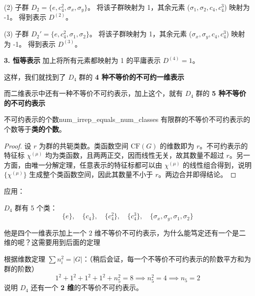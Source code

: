 (2) 子群 $D_2 = \{e, c_4^2, \sigma_x, \sigma_y\}$。
将该子群映射为 1，其余元素 ($\sigma_1, \sigma_2, c_4, c_4^3$) 映射为 -1。
得到表示 $D^{(2)}$。

(3) 子群 $D_2' = \{e, c_4^2, \sigma_1, \sigma_2\}$。
将该子群映射为 1，其余元素 ($\sigma_x, \sigma_y, c_4, c_4^3$) 映射为 -1。
得到表示 $D^{(3)}$。

\textbf{3. 恒等表示}
加上将所有元素都映射为 1 的平庸表示 $D^{(4)} = 1$。

这样，我们就找到了 $D_4$ 群的 \textbf{4 种不等价的不可约一维表示}

而二维表示中还有一种不等价不可约表示，加上这个，就有 $D_4$ 群的 \textbf{5 种不等价的不可约表示}

\begin{theorem}{不可约表示的个数}{num_irrep_equals_num_classes}
    有限群的不等价不可约表示的个数等于\textbf{类的个数}。
\end{theorem}
\begin{proof}
    设 $r$ 为群的共轭类数。类函数空间 $\mathrm{CF}(G)$ 的维数即为 $r$。不可约表示的特征标 $\chi^{(\mu)}$ 均为类函数，且两两正交，因而线性无关，故其数量不超过 $r$。另一方面，由唯一分解定理，任意表示的特征标都可以由 $\chi^{(\mu)}$ 的线性组合得到，说明 $\{\chi^{(\mu)}\}$ 生成整个类函数空间，因此其数量不小于 $r$。两边合并即得结论。
\end{proof}
应用：

$D_4$ 群有 5 个类：
    \begin{equation}
        \{e\}, \quad \{c_4\}, \quad \{c_4^{2}\},\quad \{c_4^3\} , \quad \{\sigma_x, \sigma_y ,\sigma_1, \sigma_2\}
    \end{equation}

    他是四个一维表示加上一个 $2$ 维不等价不可约表示，为什么能笃定还有一个是二维的呢？这需要用到后面的定理

    根据维数定理 $\sum n_i^2 = |G|$：（稍后会证，每一个不等价不可约表示的阶数平方和为群的阶数）
    \begin{equation}
        1^2 + 1^2 + 1^2 + 1^2 + n_5^2 = 8 \implies n_5^2 = 4 \implies n_5 = 2
    \end{equation}
    说明 $D_4$ 还有一个 \textbf{2 维}的不等价不可约表示。

